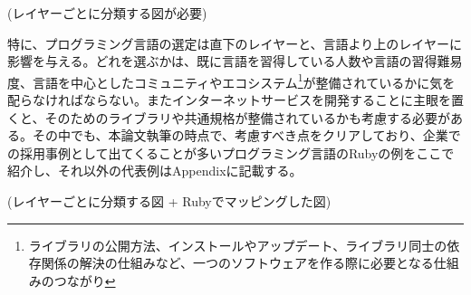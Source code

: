 (レイヤーごとに分類する図が必要)

特に、プログラミング言語の選定は直下のレイヤーと、言語より上のレイヤーに影響を与える。どれを選ぶかは、既に言語を習得している人数や言語の習得難易度、言語を中心としたコミュニティやエコシステム\footnote{ライブラリの公開方法、インストールやアップデート、ライブラリ同士の依存関係の解決の仕組みなど、一つのソフトウェアを作る際に必要となる仕組みのつながり}が整備されているかに気を配らなければならない。またインターネットサービスを開発することに主眼を置くと、そのためのライブラリや共通規格が整備されているかも考慮する必要がある。その中でも、本論文執筆の時点で、考慮すべき点をクリアしており、企業での採用事例として出てくることが多いプログラミング言語のRubyの例をここで紹介し、それ以外の代表例はAppendixに記載する。

(レイヤーごとに分類する図 + Rubyでマッピングした図)
